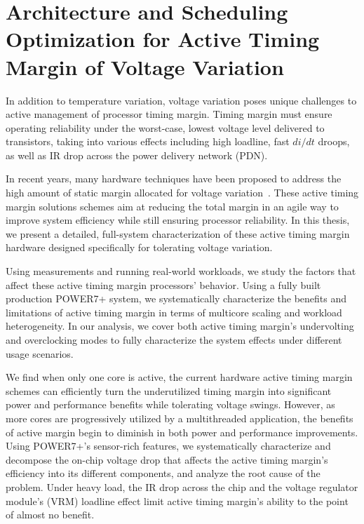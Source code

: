 
\chapter{Architecture and Scheduling Optimization for Active Timing Margin of Voltage Variation}
\label{sec:voltage}

In addition to temperature variation, voltage variation poses unique challenges to active management of processor timing margin. Timing margin must ensure operating reliability under the worst-case, lowest voltage level delivered to transistors, taking into various effects including high loadline, fast $di/dt$ droops, as well as IR drop across the power delivery network (PDN).

In recent years, many hardware techniques have been proposed to  address the high amount of static margin allocated for voltage variation~\cite{kurd2008next,lefurgy2011active,bowman201222nm,grenat20145,tokunaga20145,bowman20158}. These active timing margin solutions schemes aim at reducing the total margin in an agile way to improve system efficiency while still ensuring processor reliability. In this thesis, we present a detailed, full-system characterization of these active timing margin hardware designed specifically for tolerating voltage variation. 

Using measurements and running real-world workloads, we study the factors that affect these active timing margin processors' behavior. Using a fully built production POWER7+ system, we systematically characterize the benefits and limitations of active timing margin in terms of multicore scaling and workload heterogeneity. In our analysis, we cover both active timing margin's undervolting and overclocking modes to fully characterize the system effects under different usage scenarios. 

We find when only one core is active, the current hardware active timing margin schemes can efficiently turn the underutilized timing margin into significant power and performance benefits while tolerating voltage swings. However, as more cores are progressively utilized by a multithreaded application, the benefits of active margin begin to diminish in both power and performance improvements. Using POWER7+'s sensor-rich features, we systematically characterize and decompose the on-chip voltage drop that affects the active timing margin's efficiency into its different components, and analyze the root cause of the problem. Under heavy load, the IR drop across the chip and the voltage regulator module's (VRM) loadline effect limit active timing margin's ability to the point of almost no benefit. 


